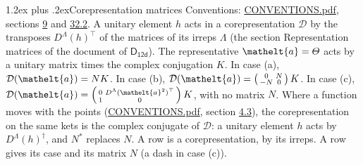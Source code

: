 \documentclass[10pt,a4paper]{article}
\makeatletter
\renewcommand\section{\@startsection{section}{1}{\z@}{-3ex plus -1ex minus -.2ex}%
  {1.2ex plus .2ex}{\normalfont\large\sffamily\bfseries\color{parttitle}}}
\numberwithin{equation}{section}
\newcommand{\eltfont}[1]{{\let\sigma\eltsigma\mathelt{#1}}}
\newcommand{\grp}[1]{\mathsf{#1}}
\newcommand{\elt}[1]{\eltfont{#1}}
\makeatother
\begin{document}
\section{Corepresentation matrices}\label{s:corep_matrices}
Conventions: \href{../../CONVENTIONS.pdf}{CONVENTIONS.pdf}, sections \href{../../../rotation/CONVENTIONS.pdf\#conv.9}{9} and \href{../../CONVENTIONS.pdf\#conv.32.2}{32.2}.
A unitary element $h$ acts in a corepresentation $\mathcal{D}$ by the transposes $D^{\Lambda}(h)^{\top}$ of the matrices of its irreps $\Lambda$ (the section Representation matrices of the document of \href{../../../rotation/data/pdf/D12d.pdf}{$\grp{D_{12d}}$}). The representative $\elt{a} = \varTheta$ acts by a unitary matrix times the complex conjugation $K$.
In case (a), $\mathcal{D}(\elt{a}) = NK$. In case (b), $\mathcal{D}(\elt{a}) = \left(\begin{smallmatrix} 0 & N \\ -N & 0 \end{smallmatrix}\right) K$. In case (c), $\mathcal{D}(\elt{a}) = \left(\begin{smallmatrix} 0 & D^{\Lambda}(\elt{a}^2)^{\top} \\ 1 & 0 \end{smallmatrix}\right) K$, with no matrix $N$.
Where a function moves with the points (\href{../../CONVENTIONS.pdf}{CONVENTIONS.pdf}, section \href{../../../rotation/CONVENTIONS.pdf\#conv.4.3}{4.3}), the corepresentation on the same kets is the complex conjugate of $\mathcal{D}$: a unitary element $h$ acts by $D^{\Lambda}(h)^{\dagger}$, and $N^{*}$ replaces $N$.
A row is a corepresentation, by its irreps. A row gives its case and its matrix $N$ (a dash in case (c)).
\end{document}

